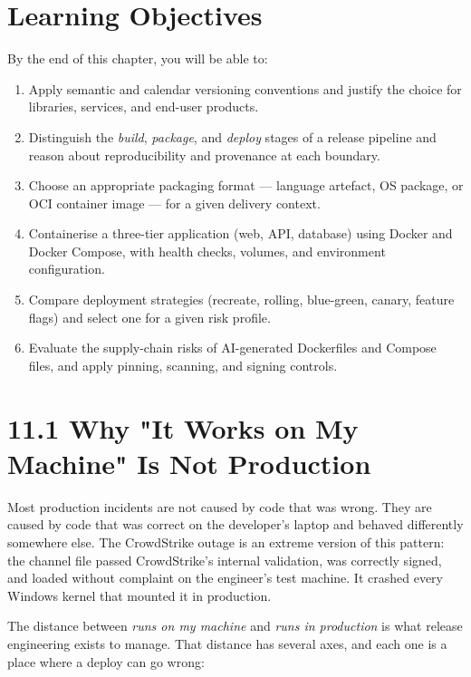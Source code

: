 \documentclass[11pt,a4paper]{book}
\begin{document}
\medskip

\section{Learning Objectives}

By the end of this chapter, you will be able to:

\begin{enumerate}
  \item Apply semantic and calendar versioning conventions and justify the choice for libraries, services, and end-user products.
  \item Distinguish the \textit{build}, \textit{package}, and \textit{deploy} stages of a release pipeline and reason about reproducibility and provenance at each boundary.
  \item Choose an appropriate packaging format --- language artefact, OS package, or OCI container image --- for a given delivery context.
  \item Containerise a three-tier application (web, API, database) using Docker and Docker Compose, with health checks, volumes, and environment configuration.
  \item Compare deployment strategies (recreate, rolling, blue-green, canary, feature flags) and select one for a given risk profile.
  \item Evaluate the supply-chain risks of AI-generated Dockerfiles and Compose files, and apply pinning, scanning, and signing controls.
\end{enumerate}

\medskip

\section{11.1 Why "It Works on My Machine" Is Not Production}

Most production incidents are not caused by code that was wrong. They are caused by code that was correct on the developer's laptop and behaved differently somewhere else. The CrowdStrike outage is an extreme version of this pattern: the channel file passed CrowdStrike's internal validation, was correctly signed, and loaded without complaint on the engineer's test machine. It crashed every Windows kernel that mounted it in production.

The distance between \textit{runs on my machine} and \textit{runs in production} is what release engineering exists to manage. That distance has several axes, and each one is a place where a deploy can go wrong:
\end{document}
